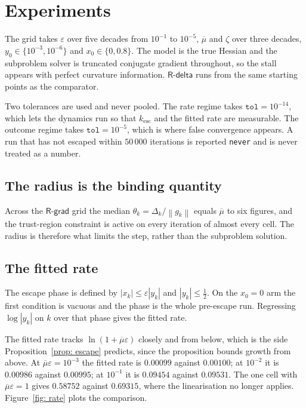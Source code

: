 \documentclass[11pt,a4paper]{article}
\providecommand{\abs}[1]{\left \vert #1 \right \vert}
\providecommand{\norm}[1]{\left \lVert #1 \right \rVert}
\providecommand{\Rdelta}{\textsf{R-delta}}
\providecommand{\Rgrad}{\textsf{R-grad}}
\theoremstyle{definition}
\theoremstyle{remark}
\begin{document}
\section{Experiments}\label{sec: experiments}

The grid takes $\varepsilon$ over five decades from $10^{-1}$ to $10^{-5}$,
$\overline{\mu}$ and $\zeta$ over three decades, $y_0 \in \{10^{-3},10^{-6}\}$
and $x_0 \in \{0, 0.8\}$. The model is the true Hessian and the subproblem
solver is truncated conjugate gradient throughout, so the stall appears with
perfect curvature information. $\Rdelta$ runs from the same starting points as
the comparator.

Two tolerances are used and never pooled. The rate regime takes
$\texttt{tol} = 10^{-14}$, which lets the dynamics run so that
$k_{\mathrm{esc}}$ and the fitted rate are measurable. The outcome regime takes
$\texttt{tol} = 10^{-5}$, which is where false convergence appears. A run that
has not escaped within $50\,000$ iterations is reported \texttt{never} and is
never treated as a number.

\subsection{The radius is the binding quantity}

Across the $\Rgrad$ grid the median $\theta_k = \Delta_k/\norm{g_k}$ equals
$\overline{\mu}$ to six figures, and the trust-region constraint is active on
every iteration of almost every cell. The radius is therefore what limits the
step, rather than the subproblem solution.

\subsection{The fitted rate}\label{sec: rate}

The escape phase is defined by $\abs{x_k} \leq \varepsilon\abs{y_k}$ and
$\abs{y_k} \leq \tfrac12$. On the $x_0 = 0$ arm the first condition is vacuous
and the phase is the whole pre-escape run. Regressing $\log\abs{y_k}$ on $k$ over
that phase gives the fitted rate.

The fitted rate tracks $\ln(1+\overline{\mu}\varepsilon)$ closely and from below,
which is the side Proposition~\ref{prop: escape} predicts, since the proposition
bounds growth from above. At $\overline{\mu}\varepsilon = 10^{-3}$ the fitted
rate is $0.00099$ against $0.00100$; at $10^{-2}$ it is $0.00986$ against
$0.00995$; at $10^{-1}$ it is $0.09454$ against $0.09531$. The one cell with
$\overline{\mu}\varepsilon = 1$ gives $0.58752$ against $0.69315$, where the
linearisation no longer applies. Figure~\ref{fig: rate} plots the comparison.
\end{document}

